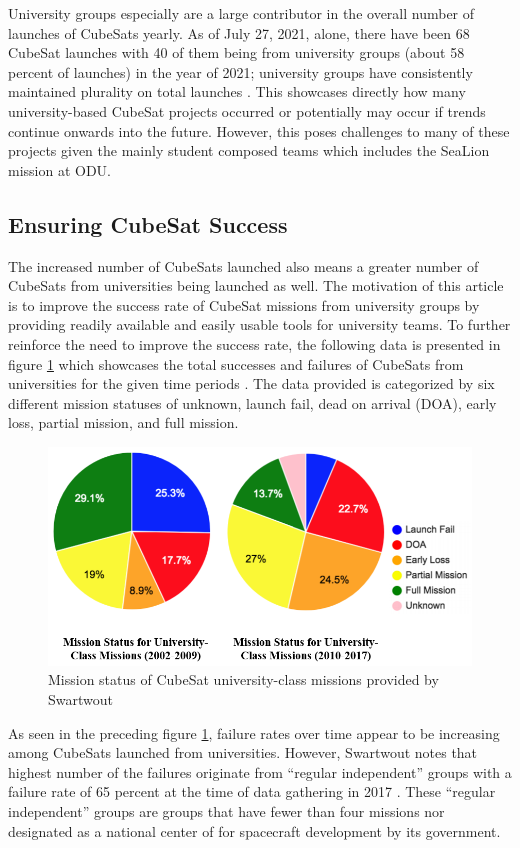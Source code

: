 \documentclass[journal,article,submit,pdftex,moreauthors]{Definitions/mdpi}
\begin{document}
University groups especially are a large contributor in the overall number of launches of CubeSats yearly.  As of July 27, 2021, alone, there have been 68 CubeSat launches with 40 of them being from university groups (about 58 percent of launches) in the year of 2021; university groups have consistently maintained plurality on total launches \cite{swartwout_data}.  This showcases directly how many university-based CubeSat projects occurred or potentially may occur if trends continue onwards into the future.  However, this poses challenges to many of these projects given the mainly student composed teams which includes the SeaLion mission at ODU.

\subsection{Ensuring CubeSat Success}
The increased number of CubeSats launched also means a greater number of CubeSats from universities being launched as well.  The motivation of this article is to improve the success rate of CubeSat missions from university groups by providing readily available and easily usable tools for university teams.  To further reinforce the need to improve the success rate, the following data is presented in figure \ref{fig:mission_status} which showcases the total successes and failures of CubeSats from universities for the given time periods \cite{reliving_24}.  The data provided is categorized by six different mission statuses of unknown, launch fail, dead on arrival (DOA), early loss, partial mission, and full mission.

\begin{figure}[H]
    \includegraphics[width=10.5 cm]{assets/mission_status.png}
    \caption{Mission status of CubeSat university-class missions provided by Swartwout}
	\label{fig:mission_status}
    \end{figure}
	\noindent   
\unskip

As seen in the preceding figure \ref{fig:mission_status}, failure rates over time appear to be increasing among CubeSats launched from universities.  However, Swartwout notes that highest number of the failures originate from “regular independent” groups with a failure rate of 65 percent at the time of data gathering in 2017 \cite{reliving_24}.  These “regular independent” groups are groups that have fewer than four missions nor designated as a national center of for spacecraft development by its government. 
\end{document}
